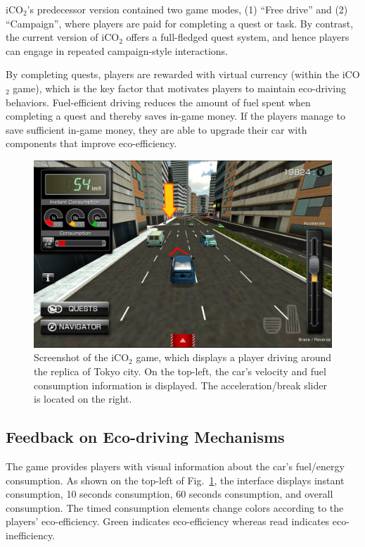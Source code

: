 \documentclass[preprint,authoryear,12pt]{elsarticle}
\begin{document}
iCO$_2$'s predecessor version \citep{prendingeroliveira2014} contained two game modes, (1) ``Free drive'' and (2) ``Campaign'', where players are paid for completing a quest or task. By contrast, the current version of iCO$_2$ offers a full-fledged quest system, and hence players can engage in repeated campaign-style interactions.

By completing quests, players are rewarded with virtual currency (within the iCO$_2$ game), which is the key factor that motivates players to maintain eco-driving behaviors. Fuel-efficient driving reduces the amount of fuel spent when completing a quest and thereby saves in-game money. If the players manage to save sufficient in-game money, they are able to upgrade their car with components that improve eco-efficiency.

\begin{figure}[htb]
\begin{center}
\includegraphics[width=.95\linewidth]{ijhcs14-img/iCO2_driving}
\caption{Screenshot of the iCO$_2$ game, which displays a player driving around the replica of Tokyo city. On the top-left, the car's velocity and fuel consumption information is displayed. The acceleration/break slider is located on the right.\label{fig:iCO2_driving}}
\end{center}
\end{figure}


\subsection{Feedback on Eco-driving Mechanisms}

The game provides players with visual information about the car's fuel/energy consumption. As shown on the top-left of Fig.~\ref{fig:iCO2_driving}, the interface displays instant consumption, 10 seconds consumption, 60 seconds consumption, and overall consumption. The timed consumption elements change colors according to the players' eco-efficiency. Green indicates eco-efficiency whereas read indicates eco-inefficiency.
\end{document}
